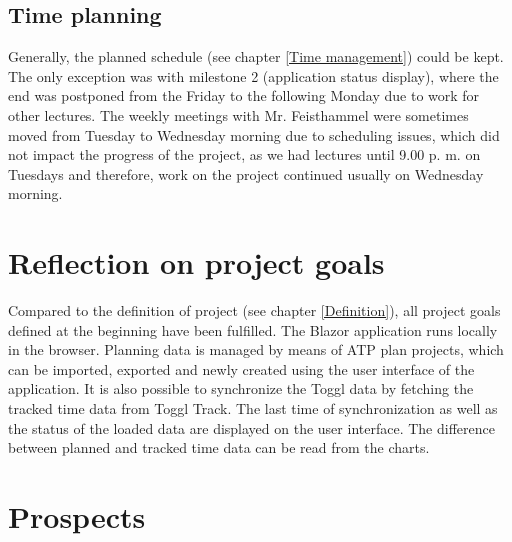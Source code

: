 \subsection{Time planning}
Generally, the planned schedule (see chapter \ref{Time management}) could be kept. The only exception was with milestone 2 (application status display), where the end was postponed from the Friday to the following Monday due to work for other lectures. The weekly meetings with Mr. Feisthammel were sometimes moved from Tuesday to Wednesday morning due to scheduling issues, which did not impact the progress of the project, as we had lectures until 9.00 p. m. on Tuesdays and therefore, work on the project continued usually on Wednesday morning.

\section{Reflection on project goals}
Compared to the definition of project (see chapter \ref{Definition}), all project goals defined at the beginning have been fulfilled. The Blazor application runs locally in the browser. Planning data is managed by means of ATP plan projects, which can be imported, exported and newly created using the user interface of the application. It is also possible to synchronize the Toggl data by fetching the tracked time data from Toggl Track. The last time of synchronization as well as the status of the loaded data are displayed on the user interface. The difference between planned and tracked time data can be read from the charts.

\section{Prospects}